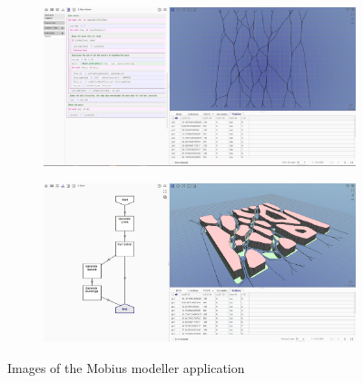 \begin{figure}
  \centering
  \begin{subfigure}[b]{0.45\linewidth}
    \graphicspath{{../../assets/images/background/geo-web-vpl/}}
    \centering
    \includegraphics[width=\linewidth]{mobius-3.png}
    \caption{}
  \end{subfigure}%
  \qquad %
  \begin{subfigure}[b]{0.45\linewidth}
    \graphicspath{{../../assets/images/background/geo-web-vpl/}}
    \centering
    \includegraphics[width=\linewidth]{mobius-4.png}
    \caption{}
  \end{subfigure}%
  \caption[Mobius Modeller]{Images of the Mobius modeller application}%
  \label{fig:mobiusmodeller}
  \end{figure}





